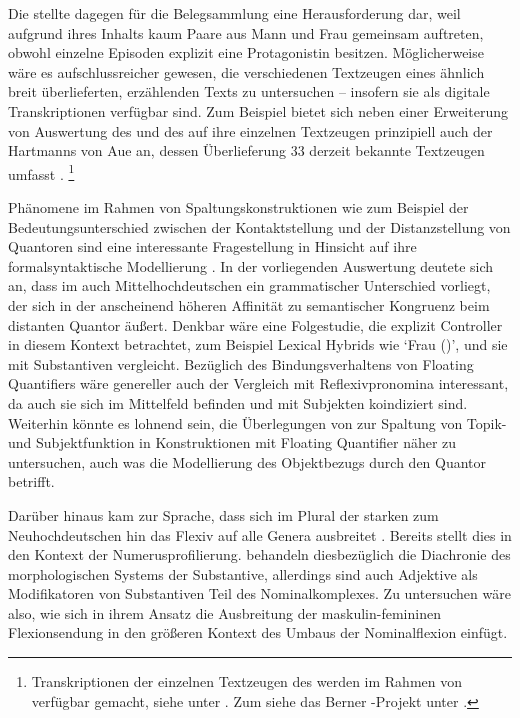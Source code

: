 Die \KC{} stellte dagegen für die Belegsammlung eine Herausforderung
dar, weil aufgrund ihres Inhalts kaum Paare aus Mann und Frau gemeinsam
auftreten, obwohl einzelne Episoden explizit eine Protagonistin besitzen.
Möglicherweise wäre es aufschlussreicher gewesen, die verschiedenen Textzeugen
eines ähnlich breit überlieferten, erzählenden Texts zu untersuchen -- insofern
sie als digitale Transkriptionen verfügbar sind. Zum Beispiel bietet sich neben
einer Erweiterung von  Auswertung des
 und des  auf ihre einzelnen Textzeugen prinzipiell
auch der  Hartmanns von Aue an, dessen Überlieferung 33 derzeit
bekannte Textzeugen umfasst \autocites[vgl.][s.\,v.~\textit{Hartmann von Aue:
}]{hsc}.%
%
	\footnote{Transkriptionen der einzelnen Textzeugen des  werden
		im Rahmen von  verfügbar gemacht, siehe unter
		. Zum  siehe das Berner
		-Projekt unter .%
	}

Phänomene im Rahmen von Spaltungskonstruktionen wie zum Beispiel der
Bedeutungs\-unterschied zwischen der Kontaktstellung und der Distanzstellung
von Quantoren sind eine interessante Fragestellung in Hinsicht auf ihre
formal\-syntaktische Modellierung \autocite[siehe
z.\,B.][]{pittner1995,merchant1996,fanselowcavar2002,nolda2007,shen2019}. In
der vorliegenden Auswertung deutete sich an, dass im auch
Mittelhochdeutschen ein grammatischer Unterschied
vorliegt, der sich in der anscheinend höheren Affinität zu semantischer
Kongruenz beim distanten Quantor äußert. Denkbar wäre eine Folgestudie, die
explizit  Controller in diesem Kontext betrachtet, zum
Beispiel Lexical Hybrids wie  `Frau (\NeutF)', und sie mit
 Substantiven vergleicht. Bezüglich des Bindungsverhaltens
von Floating Quantifiers wäre genereller auch der Vergleich mit
Reflexivpronomina interessant, da auch sie sich im Mittelfeld befinden und mit
Subjekten koindiziert sind. Weiterhin könnte es lohnend sein, die Überlegungen
von \citet{spector2009} zur Spaltung von Topik- und Subjektfunktion in
Konstruktionen mit Floating Quantifier näher zu untersuchen, auch was die
Modellierung des Objektbezugs durch den Quantor betrifft.

Darüber hinaus kam zur Sprache, dass sich im Plural der starken
 zum Neuhochdeutschen hin das
Flexiv  auf alle Genera ausbreitet
\autocite[vgl.][191--192]{reichmannwegera1993}. Bereits \citet{askedal1973}
stellt dies in den Kontext der Numerusprofilierung. \citet{dammelgillmann2014}
behandeln diesbezüglich die Diachronie des morphologischen Systems der
Substantive, allerdings sind auch Adjektive als
Modifikatoren von Substantiven Teil des Nominalkomplexes. Zu untersuchen wäre
also, wie sich in ihrem Ansatz die Ausbreitung der maskulin-femininen
Flexionsendung in den größeren Kontext des Umbaus der Nominal\-flexion einfügt.

